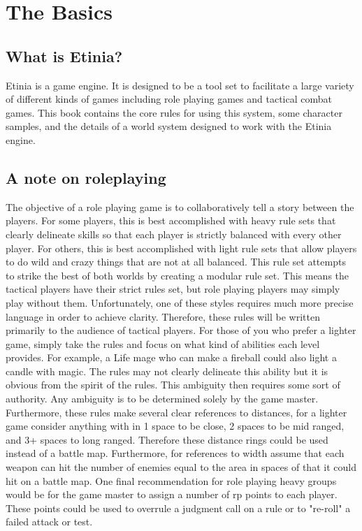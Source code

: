 \chapter{The Basics}
\section{What is Etinia?}
Etinia is a game engine. It is designed to be a tool set to facilitate a large
variety of different kinds of games including role playing games and tactical
combat games. This book contains the core rules for using this system, some
character samples, and the details of a world system designed to work with the
Etinia engine.
\section{A note on roleplaying}
The objective of a role playing game is to collaboratively tell a story between
the players. For some players, this is best accomplished with heavy rule sets
that clearly delineate skills so that each player is strictly balanced with
every other player. For others, this is best accomplished with light rule sets
that allow players to do wild and crazy things that are not at all balanced.
This rule set attempts to strike the best of both worlds by creating a modular
rule set. This means the tactical players have their strict rules set, but
role playing players may simply play without them. Unfortunately, one of these
styles requires much more precise language in order to achieve clarity.
Therefore, these rules will be written primarily to the audience of tactical
players. For those of you who prefer a lighter game, simply take the rules and
focus on what kind of abilities each level provides. For example, a Life mage
who can make a fireball could also light a candle with magic. The rules may
not clearly delineate this ability but it is obvious from the spirit of the
rules. This ambiguity then requires some sort of authority. Any ambiguity is
to be determined solely by the game master. Furthermore, these rules make
several clear references to distances, for a lighter game consider anything
with in 1 space to be close, 2 spaces to be mid ranged, and 3+ spaces to long
ranged. Therefore these distance rings could be used instead of a battle map.
Furthermore, for references to width assume that each weapon can hit the number
of enemies equal to the area in spaces of that it could hit on a battle map.
One final recommendation for role playing heavy groups would be for the game
master to assign a number of rp points to each player. These points could be
used to overrule a judgment call on a rule or to "re-roll" a failed attack or
test.

